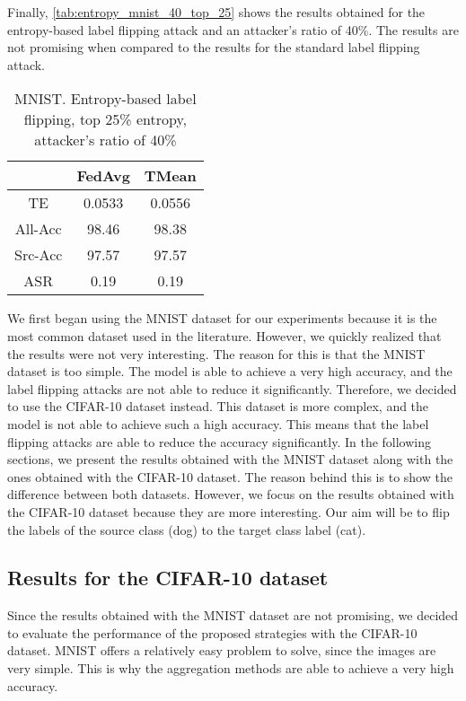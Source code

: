 Finally, \autoref{tab:entropy_mnist_40_top_25} shows the results obtained for the entropy-based label flipping attack and an attacker's ratio of 40\%.
The results are not promising when compared to the results for the standard label flipping attack.

\begin{table}[h!]
        \centering
        \begin{tabular}{|c|c|c|}
            \hline
            & FedAvg & TMean \\
            \hline
            TE & 0.0533 & 0.0556 \\
            \hline
            All-Acc & 98.46 & 98.38 \\
            \hline
            Src-Acc & 97.57 & 97.57 \\
            \hline
            ASR & 0.19 & 0.19 \\
            \hline
        \end{tabular}
        \caption{MNIST. Entropy-based label flipping, top 25\% entropy, attacker's ratio of 40\%}
        \label{tab:entropy_mnist_40_top_25}
    \end{table}
We first began using the MNIST dataset for our experiments because it is the most common dataset used in the literature. However, we quickly realized that the results were not very interesting. The reason for this is that the MNIST dataset is too simple. The model is able to achieve a very high accuracy, and the label flipping attacks are not able to reduce it significantly. Therefore, we decided to use the CIFAR-10 dataset instead. This dataset is more complex, and the model is not able to achieve such a high accuracy. This means that the label flipping attacks are able to reduce the accuracy significantly. In the following sections, we present the results obtained with the MNIST dataset along with the ones obtained with the CIFAR-10 dataset. The reason behind this is to show the difference between both datasets. However, we focus on the results obtained with the CIFAR-10 dataset because they are more interesting. Our aim will be to flip the labels of the source class (dog) to the target class label (cat). 
    

\subsection{Results for the CIFAR-10 dataset}
Since the results obtained with the MNIST dataset are not promising, we decided to evaluate the performance of the proposed strategies with the CIFAR-10 dataset.
MNIST offers a relatively easy problem to solve, since the images are very simple. This is why the aggregation methods are able to achieve a very high accuracy.


